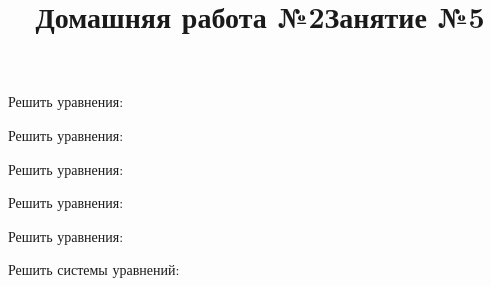 \newpage
\title{Домашняя работа №2}
\begin{listofex}
	\item Решить уравнения:
	\begin{enumcols}[itemcolumns=1]
		\item {}
		\item {}
		\item {}
		\item {}
		\item {}
		\item {}
	\end{enumcols}
	\item Решить уравнения:
	\begin{enumcols}[itemcolumns=2]
		\item {}
		\item {}
		\item {}
		\item {}
	\end{enumcols}
	\item {}
	\item Решить уравнения:
	\begin{enumcols}[itemcolumns=2]
		\item {}
		\item {}
		\item {}
		\item {}
	\end{enumcols}
\end{listofex}
\newpage
\title{Занятие №5}
\begin{listofex}
	\item {}
	\item Решить уравнения:
	\begin{enumcols}[itemcolumns=2]
		\item {}
		\item {}
		\item {}
		\item {}
		\item {}
	\end{enumcols}
	\item {}
	\item Решить уравнения:
	\begin{enumcols}[itemcolumns=2]
		\item {}
		\item {}
	\end{enumcols}
	\item Решить системы уравнений:
	\begin{enumcols}[itemcolumns=2]
		\item {}
		\item {}
	\end{enumcols}
\end{listofex}
